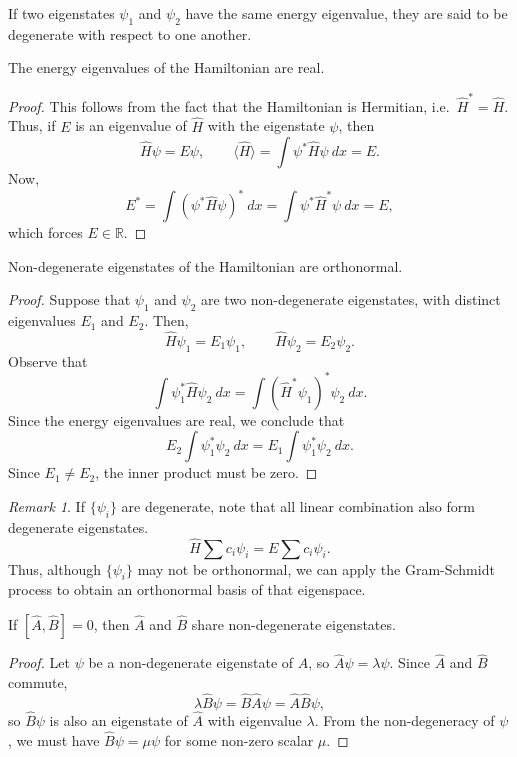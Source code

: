 \documentclass[11pt]{article}
\def\R{\mathbb{R}}
\newcommand\E[1]{\langle #1 \rangle}
\theoremstyle{definition}
\theoremstyle{remark}
\newtheorem*{remark}{Remark}
\numberwithin{equation}{section}
\begin{document}
    \begin{definition}
        If two eigenstates $\psi_1$ and $\psi_2$ have the same energy eigenvalue,
        they are said to be degenerate with respect to one another.
    \end{definition}

    \begin{theorem}
        The energy eigenvalues of the Hamiltonian are real.
    \end{theorem}
    \begin{proof}
        This follows from the fact that the Hamiltonian is Hermitian, i.e.\
        $\hat{H}^* = \hat{H}$. Thus, if $E$ is an eigenvalue of $\hat{H}$ with
        the eigenstate $\psi$, then \[
            \hat{H}\psi = E\psi, \qquad \E{\hat{H}} = \int \psi^*\hat{H}\psi\:dx =
            E.
        \] Now, \[
            E^* = \int (\psi^*\hat{H}\psi)^*\:dx = \int \psi^*\hat{H}^*\psi\:dx = E,
        \] which forces $E \in \R$.
    \end{proof}

    \begin{theorem}
        Non-degenerate eigenstates of the Hamiltonian are orthonormal.
    \end{theorem}
    \begin{proof}
        Suppose that $\psi_1$ and $\psi_2$ are two non-degenerate eigenstates, with
        distinct eigenvalues $E_1$ and $E_2$. Then, \[
            \hat{H}\psi_1 = E_1\psi_1, \qquad \hat{H}\psi_2 = E_2\psi_2.
        \] Observe that \[
            \int \psi_1^*\hat{H}\psi_2\:dx = \int (\hat{H}^*\psi_1)^*\psi_2\:dx.
        \] Since the energy eigenvalues are real, we conclude that \[
            E_2 \int \psi_1^*\psi_2\:dx = E_1 \int \psi_1^*\psi_2\:dx.
        \] Since $E_1 \neq E_2$, the inner product must be zero.
    \end{proof}
    \begin{remark}
        If $\{\psi_i\}$ are degenerate, note that all linear combination
        also form degenerate eigenstates. \[
            \hat{H}\sum c_i\psi_i = E\sum c_i\psi_i.
        \] Thus, although $\{\psi_i\}$ may not be orthonormal, we can apply the
        Gram-Schmidt process to obtain an orthonormal basis of that eigenspace.
    \end{remark}

    \begin{theorem}
        If $[\hat{A}, \hat{B}] = 0$, then $\hat{A}$ and $\hat{B}$ share
        non-degenerate eigenstates.
    \end{theorem}
    \begin{proof}
        Let $\psi$ be a non-degenerate eigenstate of $\hat{A}$, so $\hat{A}\psi =
        \lambda \psi$. Since $\hat{A}$ and $\hat{B}$ commute, \[
            \lambda \hat{B}\psi = \hat{B}\hat{A}\psi = \hat{A}\hat{B}\psi,
        \] so $\hat{B}\psi$ is also an eigenstate of $\hat{A}$ with eigenvalue
        $\lambda$. From the non-degeneracy of $\psi$, we must have $\hat{B}\psi =
        \mu\psi$ for some non-zero scalar $\mu$.
    \end{proof}
    
\end{document}
